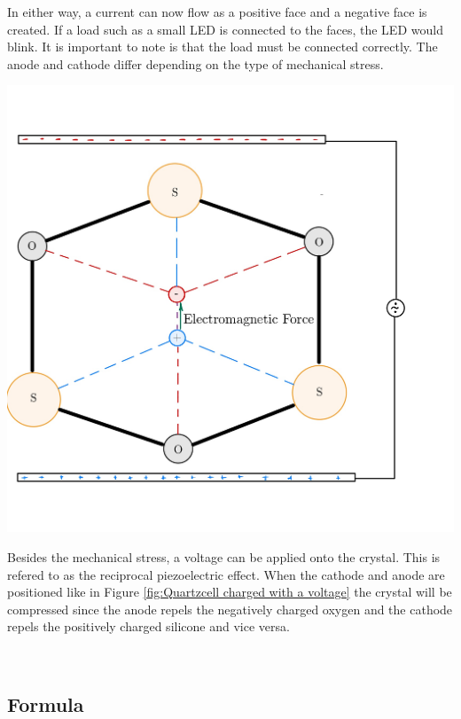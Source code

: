 \vspace{0.5cm}
\noindent In either way, a current can now flow as a positive face and a negative face is created. If a load such as a small LED is connected to the faces, the LED would blink. It is important to note is that the load must be connected correctly. The anode and cathode differ depending on the type of mechanical stress.\\
\begin{minipage}{0.33\textwidth}
    \includegraphics[width=\textwidth]{./Figure_4.jpg}
    \label{fig:Quartzcell charged with a voltage}
\end{minipage}
\begin{minipage}{0.66\textwidth}
    Besides the mechanical stress, a voltage can be applied onto the crystal. This is refered to as the reciprocal piezoelectric effect. When the cathode and anode are positioned like in  Figure \ref{fig:Quartzcell charged with a voltage} the crystal will be compressed since the anode repels the negatively charged oxygen and the cathode repels the positively charged silicone and vice versa.\cite{Elprocus2023}\\
\end{minipage}
\\
 
\subsection{Formula}

